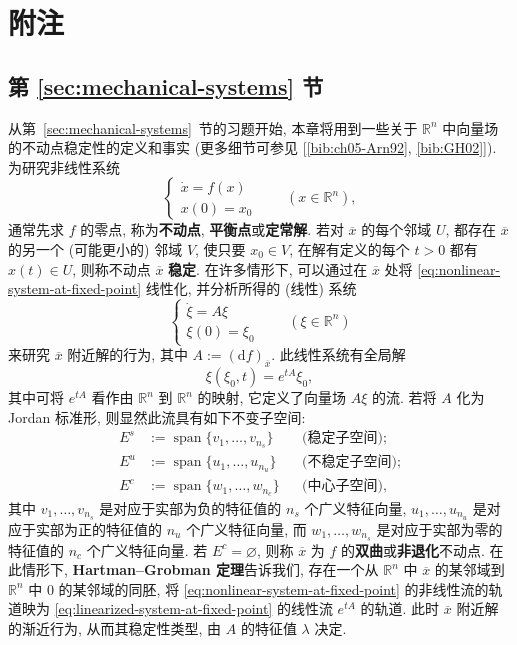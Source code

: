 \section{附注}\label{sec:notes-on-geometric-mechanics}

\subsection{第 \ref{sec:mechanical-systems} 节}\label{subsec:notes-mechanical-systems}

从第~\ref{sec:mechanical-systems}~节的习题开始, 本章将用到一些关于 $\mathbb{R}^n$ 中向量场的不动点稳定性的定义和事实 (更多细节可参见 [\ref{bib:ch05-Arn92}, \ref{bib:GH02}]). 为研究非线性系统
\begin{equation}\label{eq:nonlinear-system-at-fixed-point}
  \begin{cases}
    \dot x=f(x)\\
    x(0)=x_0
  \end{cases}
  \qquad(x\in\mathbb{R}^n),
\end{equation}
通常先求 $f$ 的零点, 称为\textbf{不动点}, \textbf{平衡点}或\textbf{定常解}. 若对 $\overline x$ 的每个邻域 $U$, 都存在 $\overline x$ 的另一个 (可能更小的) 邻域 $V$, 使只要 $x_0\in V$, 在解有定义的每个 $t>0$ 都有 $x(t)\in U$, 则称不动点 $\overline x$ \textbf{稳定}. 在许多情形下, 可以通过在 $\overline x$ 处将 \eqref{eq:nonlinear-system-at-fixed-point} 线性化, 并分析所得的 (线性) 系统
\begin{equation}\label{eq:linearized-system-at-fixed-point}
  \begin{cases}
    \dot\xi=A\xi\\
    \xi(0)=\xi_0
  \end{cases}
  \qquad(\xi\in\mathbb{R}^n)
\end{equation}
来研究 $\overline x$ 附近解的行为, 其中 $A:=(\mathrm{d}f)_{\overline x}$. 此线性系统有全局解
\[
  \xi(\xi_0,t)=e^{tA}\xi_0,
\]
其中可将 $e^{tA}$ 看作由 $\mathbb{R}^n$ 到 $\mathbb{R}^n$ 的映射, 它定义了向量场 $A\xi$ 的流. 若将 $A$ 化为 Jordan 标准形, 则显然此流具有如下不变子空间:
\begin{align*}
  E^s&:=\operatorname{span}\{v_1,\ldots,v_{n_s}\}
       &&\text{(稳定子空间)};\\
  E^u&:=\operatorname{span}\{u_1,\ldots,u_{n_u}\}
       &&\text{(不稳定子空间)};\\
  E^c&:=\operatorname{span}\{w_1,\ldots,w_{n_c}\}
       &&\text{(中心子空间)},
\end{align*}
其中 $v_1,\ldots,v_{n_s}$ 是对应于实部为负的特征值的 $n_s$ 个广义特征向量, $u_1,\ldots,u_{n_u}$ 是对应于实部为正的特征值的 $n_u$ 个广义特征向量, 而 $w_1,\ldots,w_{n_s}$ 是对应于实部为零的特征值的 $n_c$ 个广义特征向量. 若 $E^c=\varnothing$, 则称 $\overline x$ 为 $f$ 的\textbf{双曲}或\textbf{非退化}不动点. 在此情形下, \textbf{Hartman–Grobman 定理}告诉我们, 存在一个从 $\mathbb{R}^n$ 中 $\overline x$ 的某邻域到 $\mathbb{R}^n$ 中 $0$ 的某邻域的同胚, 将 \eqref{eq:nonlinear-system-at-fixed-point} 的非线性流的轨道映为 \eqref{eq:linearized-system-at-fixed-point} 的线性流 $e^{tA}$ 的轨道. 此时 $\overline x$ 附近解的渐近行为, 从而其稳定性类型, 由 $A$ 的特征值 $\lambda$ 决定.

